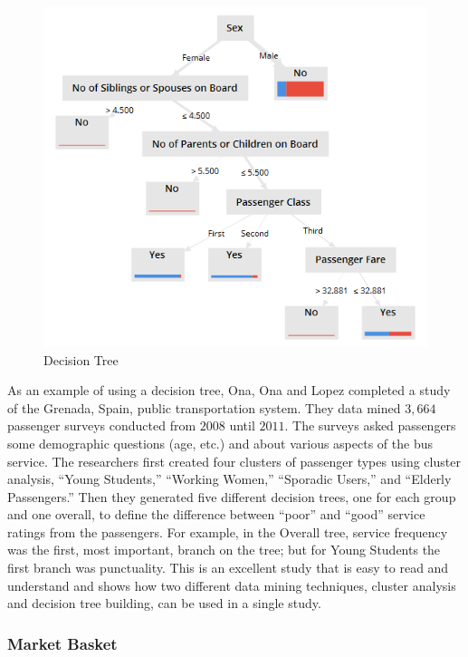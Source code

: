 \begin{figure}[H]
	\centering
	\includegraphics[width=\maxwidth{.95\linewidth}]{gfx/06-DecisionTree}
	\caption{Decision Tree}
	\label{fig06.05}
\end{figure}

As an example of using a decision tree, Ona, Ona and Lopez completed a study of the Grenada, Spain, public transportation system\cite{de2016transit}. They data mined $ 3,664 $ passenger surveys conducted from $ 2008 $ until $ 2011 $. The surveys asked passengers some demographic questions (age, etc.) and about various aspects of the bus service. The researchers first created four clusters of passenger types using cluster analysis, ``Young Students,'' ``Working Women,'' ``Sporadic Users,'' and ``Elderly Passengers.'' Then they generated five different decision trees, one for each group and one overall, to define the difference between ``poor'' and ``good'' service ratings from the passengers. For example, in the Overall tree, service frequency was the first, most important, branch on the tree; but for Young Students the first branch was punctuality. This is an excellent study that is easy to read and understand and shows how two different data mining techniques, cluster analysis and decision tree building, can be used in a single study.

\subsubsection{Market Basket}

